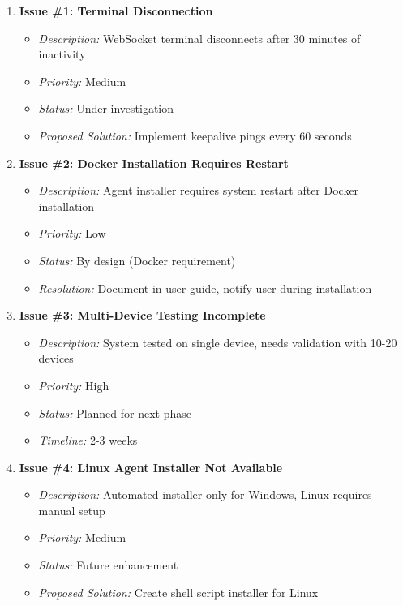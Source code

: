 \documentclass[12pt,a4paper]{article}
\begin{document}
\begin{enumerate}
    \item \textbf{Issue \#1: Terminal Disconnection}
    \begin{itemize}[noitemsep]
        \item \textit{Description:} WebSocket terminal disconnects after 30 minutes of inactivity
        \item \textit{Priority:} Medium
        \item \textit{Status:} Under investigation
        \item \textit{Proposed Solution:} Implement keepalive pings every 60 seconds
    \end{itemize}
    
    \item \textbf{Issue \#2: Docker Installation Requires Restart}
    \begin{itemize}[noitemsep]
        \item \textit{Description:} Agent installer requires system restart after Docker installation
        \item \textit{Priority:} Low
        \item \textit{Status:} By design (Docker requirement)
        \item \textit{Resolution:} Document in user guide, notify user during installation
    \end{itemize}
    
    \item \textbf{Issue \#3: Multi-Device Testing Incomplete}
    \begin{itemize}[noitemsep]
        \item \textit{Description:} System tested on single device, needs validation with 10-20 devices
        \item \textit{Priority:} High
        \item \textit{Status:} Planned for next phase
        \item \textit{Timeline:} 2-3 weeks
    \end{itemize}
    
    \item \textbf{Issue \#4: Linux Agent Installer Not Available}
    \begin{itemize}[noitemsep]
        \item \textit{Description:} Automated installer only for Windows, Linux requires manual setup
        \item \textit{Priority:} Medium
        \item \textit{Status:} Future enhancement
        \item \textit{Proposed Solution:} Create shell script installer for Linux
    \end{itemize}
    

\end{enumerate}
\end{document}
